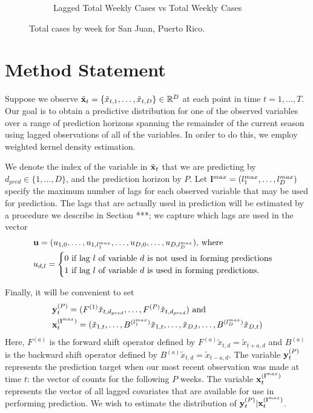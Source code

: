 \documentclass[fleqn]{article}\usepackage[]{graphicx}\usepackage[]{color}
\newenvironment{knitrout}{}{} %
\begin{document}
\begin{figure}[t!]
\begin{subfigure}[t]{0.475\textwidth}
\begin{knitrout}
\end{knitrout}
\caption{Lagged Total Weekly Cases vs Total Weekly Cases}
\end{subfigure}
\caption{Total cases by week for San Juan, Puerto Rico.}
\label{fig:SJPRWeeklyCaseCounts}
\end{figure}

\section{Method Statement}
\label{sec:MethodStatement}

Suppose we observe $\tilde{{\bf x}}_t = \{\tilde{x}_{t,1}, \ldots, \tilde{x}_{t,D}\} \in \mathbb{R}^D$ at each point in time $t = 1, \ldots, T$.  Our goal is to obtain a predictive distribution for one of the observed variables over a range of prediction horizons spanning the remainder of the current season using lagged observations of all of the variables.  In order to do this, we employ weighted kernel density estimation.

We denote the index of the variable in $\tilde{{\bf x}}_t$ that we are predicting by $d_{pred} \in \{1, \ldots, D\}$, and the prediction horizon by $P$.  Let ${\bf l}^{max} = (l^{max}_1, \ldots, l^{max}_D)$ specify the maximum number of lags for each observed variable that may be used for prediction.  The lags that are actually used in prediction will be estimated by a procedure we describe in Section ***; we capture which lags are used in the vector 
\begin{align*}
&{\bf u} = (u_{1,0}, \ldots, u_{1, l^{max}_1}, \ldots, u_{D,0}, \ldots, u_{D, l^{max}_D}) \text{, where} \\
&u_{d, l} = \begin{cases} 0 \text{ if lag $l$ of variable $d$ is not used in forming predictions} \\ 1 \text{ if lag $l$ of variable $d$ is used in forming predictions.} \end{cases}
\end{align*}

Finally, it will be convenient to set
\begin{align*}
&{\bf y}_t^{(P)} = (F^{(1)} \tilde{x}_{t, d_{pred}}, \ldots, F^{(P)} \tilde{x}_{t, d_{pred}}) \text{ and} \\
&{\bf x}_t^{({\bf l}^{max})} = (\tilde{x}_{1,t}, \ldots, B^{(l^{max}_1)} \tilde{x}_{1, t}, \ldots, \tilde{x}_{D,t}, \ldots, B^{(l^{max}_D)} \tilde{x}_{D, t})
\end{align*}
Here, $F^{(a)}$ is the forward shift operator defined by $F^{(a)} \tilde{x}_{t, d} = \tilde{x}_{t + a, d}$ and $B^{(a)}$ is the backward shift operator defined by $B^{(a)} \tilde{x}_{t, d} = \tilde{x}_{t - a, d}$.  The variable ${\bf y}_t^{(P)}$ represents the prediction target when our most recent observation was made at time $t$: the vector of counts for the following $P$ weeks.  The variable ${\bf x}_t^{({\bf l}^{max})}$ represents the vector of all lagged covariates that are available for use in performing prediction.  We wish to estimate the distribution of ${\bf y}_t^{(P)} | {\bf x}_t^{({\bf l}^{max})}$.
\end{document}
